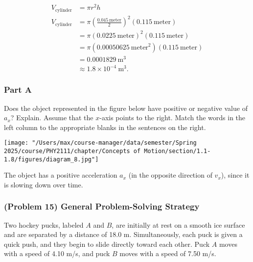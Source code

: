 \vspace{1em}

\begin{solution}
	\begin{align*}
		V_{\text{cylinder}} &= \pi r^2 h \\
		V_{\text{cylinder}} &= \pi \left( \frac{0.045~\text{meter}}{2} \right)^2 \left( 0.115~\text{meter} \right) \\
		&= \pi \left( 0.0225~\text{meter} \right)^2 \left( 0.115~\text{meter} \right) \\
		&= \pi \left( 0.00050625~\text{meter}^2 \right) \left( 0.115~\text{meter} \right) \\
		&= 0.0001829~\text{m}^3 \\
		&\approx 1.8 \times 10^{-4}~\text{m}^3
		.\end{align*}
\end{solution}

\newpage

\subsubsection{Part A}

Does the object represented in the figure below have positive or negative value of $a_{x}$? Explain. Assume that the $x$-axis points to the right. Match the words in the left column to the appropriate blanks in the sentences on the right.

\begin{center}
	\texttt{[image: "/Users/max/course-manager/data/semester/Spring 2025/course/PHY2111/chapter/Concepts of Motion/section/1.1-1.8/figures/diagram\_8.jpg"]}
\end{center}

\begin{solution}
	The object has a positive acceleration $a_x$ (in the opposite direction of $v_x$), since it is slowing down over time.
\end{solution}

\newpage

\subsubsection{(Problem 15) General Problem-Solving Strategy}

Two hockey pucks, labeled $A$ and $B$, are initially at rest on a smooth ice surface and are separated by a distance of 18.0 m. Simultaneously, each puck is given a quick push, and they begin to slide directly toward each other. Puck $A$ moves with a speed of 4.10 m/s, and puck $B$ moves with a speed of 7.50 m/s.

